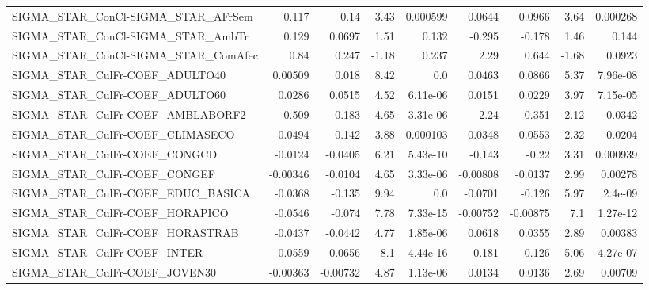 \begin{tabular}{lrrrrrrrr}
SIGMA\_STAR\_ConCl-SIGMA\_STAR\_AFrSem    &       0.117 &         0.14 &     3.43 & 0.000599 &     0.0644 &      0.0966 &         3.64 &      0.000268 \\
SIGMA\_STAR\_ConCl-SIGMA\_STAR\_AmbTr     &       0.129 &       0.0697 &     1.51 &    0.132 &     -0.295 &      -0.178 &         1.46 &         0.144 \\
SIGMA\_STAR\_ConCl-SIGMA\_STAR\_ComAfec   &        0.84 &        0.247 &    -1.18 &    0.237 &       2.29 &       0.644 &        -1.68 &        0.0923 \\
SIGMA\_STAR\_CulFr-COEF\_ADULTO40        &     0.00509 &        0.018 &     8.42 &      0.0 &     0.0463 &      0.0866 &         5.37 &      7.96e-08 \\
SIGMA\_STAR\_CulFr-COEF\_ADULTO60        &      0.0286 &       0.0515 &     4.52 & 6.11e-06 &     0.0151 &      0.0229 &         3.97 &      7.15e-05 \\
SIGMA\_STAR\_CulFr-COEF\_AMBLABORF2      &       0.509 &        0.183 &    -4.65 & 3.31e-06 &       2.24 &       0.351 &        -2.12 &        0.0342 \\
SIGMA\_STAR\_CulFr-COEF\_CLIMASECO       &      0.0494 &        0.142 &     3.88 & 0.000103 &     0.0348 &      0.0553 &         2.32 &        0.0204 \\
SIGMA\_STAR\_CulFr-COEF\_CONGCD          &     -0.0124 &      -0.0405 &     6.21 & 5.43e-10 &     -0.143 &       -0.22 &         3.31 &      0.000939 \\
SIGMA\_STAR\_CulFr-COEF\_CONGEF          &    -0.00346 &      -0.0104 &     4.65 & 3.33e-06 &   -0.00808 &     -0.0137 &         2.99 &       0.00278 \\
SIGMA\_STAR\_CulFr-COEF\_EDUC\_BASICA     &     -0.0368 &       -0.135 &     9.94 &      0.0 &    -0.0701 &      -0.126 &         5.97 &       2.4e-09 \\
SIGMA\_STAR\_CulFr-COEF\_HORAPICO        &     -0.0546 &       -0.074 &     7.78 & 7.33e-15 &   -0.00752 &    -0.00875 &          7.1 &      1.27e-12 \\
SIGMA\_STAR\_CulFr-COEF\_HORASTRAB       &     -0.0437 &      -0.0442 &     4.77 & 1.85e-06 &     0.0618 &      0.0355 &         2.89 &       0.00383 \\
SIGMA\_STAR\_CulFr-COEF\_INTER           &     -0.0559 &      -0.0656 &      8.1 & 4.44e-16 &     -0.181 &      -0.126 &         5.06 &      4.27e-07 \\
SIGMA\_STAR\_CulFr-COEF\_JOVEN30         &    -0.00363 &     -0.00732 &     4.87 & 1.13e-06 &     0.0134 &      0.0136 &         2.69 &       0.00709 \\

\end{tabular}
